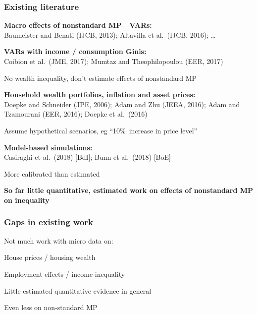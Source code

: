 \documentclass[pdflatex,aspectratio=169]{beamer}
\newcommand{\jemph}[1]{{\color{StataDarkBlue}#1}}
\newcommand{\jbemph}[1]{\textbf{\color{SlideNavy}#1}}
\begin{document}
\begin{frame}\frametitle{\bf Existing literature}
\bi
\setlength{\itemsep}{2mm}
\item \jbemph{Macro effects of nonstandard MP---VARs:}\\
{\footnotesize Baumeister and Benati (IJCB, 2013); Altavilla et al.\ (IJCB, 2016); \dots}
\item \jbemph{VARs with income / consumption Ginis:}\\
{\footnotesize  Coibion et al.\ (JME, 2017); Mumtaz and Theophilopoulou (EER, 2017)}
\bi
\item No \jemph{wealth} inequality, don't estimate effects of \jemph{nonstandard MP}
\ei
\item \jbemph{Household wealth portfolios, inflation and asset prices:}\\
{\footnotesize  Doepke and Schneider (JPE, 2006); Adam and Zhu (JEEA, 2016); Adam and Tzamourani (EER, 2016); Doepke et al.\ (2016)}
\bi
\item Assume \jemph{hypothetical scenarios,} eg ``10\%\ increase in price level''
\ei
\item \jbemph{Model-based simulations:}\\
{\footnotesize Casiraghi et al.\ (2018) [BdI]; Bunn et al.\ (2018) [BoE]}
\bi
\item More calibrated than estimated
\ei
\ei

\bi
\item \jbemph{So far little quantitative, estimated work on effects of nonstandard MP on inequality}
\ei

\end{frame}


\begin{frame}\frametitle{\bf Gaps in existing work }
Not much work with micro data on:\\
\bi
\setlength{\itemsep}{2mm}
\item House prices / housing wealth
\item Employment effects / income inequality
\item Little estimated quantitative evidence in general
\item Even less on non-standard MP
\ei

\end{frame}
\end{document}

